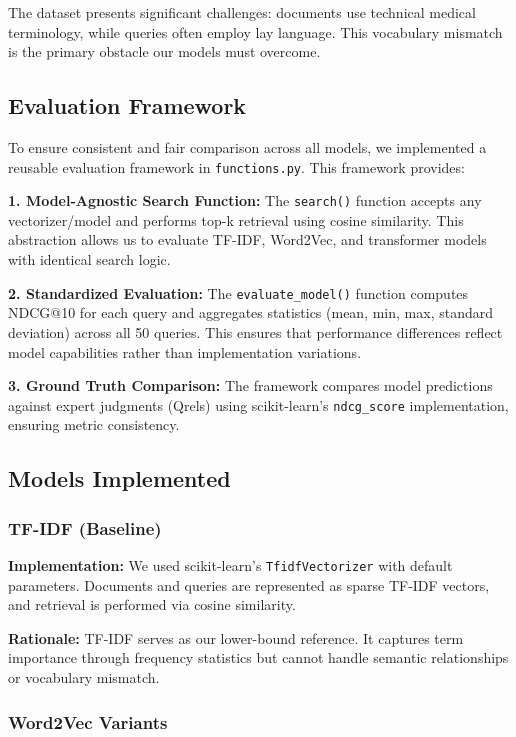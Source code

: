 \documentclass[sigconf,nonacm]{acmart}
\begin{document}
The dataset presents significant challenges: documents use technical medical terminology, while queries often employ lay language. This vocabulary mismatch is the primary obstacle our models must overcome.

\subsection{Evaluation Framework}
To ensure consistent and fair comparison across all models, we implemented a reusable evaluation framework in \texttt{functions.py}. This framework provides:

\textbf{1. Model-Agnostic Search Function:} The \texttt{search()} function accepts any vectorizer/model and performs top-k retrieval using cosine similarity. This abstraction allows us to evaluate TF-IDF, Word2Vec, and transformer models with identical search logic.

\textbf{2. Standardized Evaluation:} The \texttt{evaluate\_model()} function computes NDCG@10 for each query and aggregates statistics (mean, min, max, standard deviation) across all 50 queries. This ensures that performance differences reflect model capabilities rather than implementation variations.

\textbf{3. Ground Truth Comparison:} The framework compares model predictions against expert judgments (Qrels) using scikit-learn's \texttt{ndcg\_score} implementation, ensuring metric consistency.

\subsection{Models Implemented}

\subsubsection{TF-IDF (Baseline)}
\textbf{Implementation:} We used scikit-learn's \texttt{TfidfVectorizer} with default parameters. Documents and queries are represented as sparse TF-IDF vectors, and retrieval is performed via cosine similarity.

\textbf{Rationale:} TF-IDF serves as our lower-bound reference. It captures term importance through frequency statistics but cannot handle semantic relationships or vocabulary mismatch.

\subsubsection{Word2Vec Variants}
\end{document}
